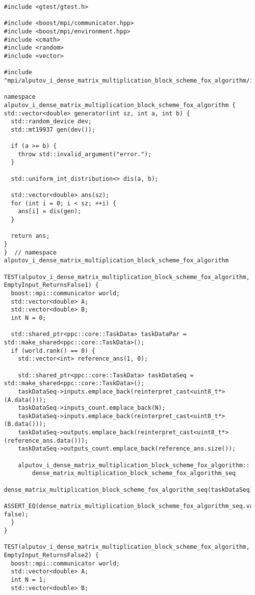 \documentclass{report}
\begin{document}
\begin{lstlisting}[caption={main.cpp(func tests)},label=lst:opsmpi2]
#include <gtest/gtest.h>

#include <boost/mpi/communicator.hpp>
#include <boost/mpi/environment.hpp>
#include <cmath>
#include <random>
#include <vector>

#include "mpi/alputov_i_dense_matrix_multiplication_block_scheme_fox_algorithm/include/ops_mpi.hpp"

namespace alputov_i_dense_matrix_multiplication_block_scheme_fox_algorithm {
std::vector<double> generator(int sz, int a, int b) {
  std::random_device dev;
  std::mt19937 gen(dev());

  if (a >= b) {
    throw std::invalid_argument("error.");
  }

  std::uniform_int_distribution<> dis(a, b);

  std::vector<double> ans(sz);
  for (int i = 0; i < sz; ++i) {
    ans[i] = dis(gen);
  }

  return ans;
}
}  // namespace alputov_i_dense_matrix_multiplication_block_scheme_fox_algorithm

TEST(alputov_i_dense_matrix_multiplication_block_scheme_fox_algorithm, EmptyInput_ReturnsFalse1) {
  boost::mpi::communicator world;
  std::vector<double> A;
  std::vector<double> B;
  int N = 0;

  std::shared_ptr<ppc::core::TaskData> taskDataPar = std::make_shared<ppc::core::TaskData>();
  if (world.rank() == 0) {
    std::vector<int> reference_ans(1, 0);

    std::shared_ptr<ppc::core::TaskData> taskDataSeq = std::make_shared<ppc::core::TaskData>();
    taskDataSeq->inputs.emplace_back(reinterpret_cast<uint8_t*>(A.data()));
    taskDataSeq->inputs_count.emplace_back(N);
    taskDataSeq->inputs.emplace_back(reinterpret_cast<uint8_t*>(B.data()));
    taskDataSeq->outputs.emplace_back(reinterpret_cast<uint8_t*>(reference_ans.data()));
    taskDataSeq->outputs_count.emplace_back(reference_ans.size());

    alputov_i_dense_matrix_multiplication_block_scheme_fox_algorithm::
        dense_matrix_multiplication_block_scheme_fox_algorithm_seq
            dense_matrix_multiplication_block_scheme_fox_algorithm_seq(taskDataSeq);
    ASSERT_EQ(dense_matrix_multiplication_block_scheme_fox_algorithm_seq.validation(), false);
  }
}

TEST(alputov_i_dense_matrix_multiplication_block_scheme_fox_algorithm, EmptyInput_ReturnsFalse2) {
  boost::mpi::communicator world;
  std::vector<double> A;
  int N = 1;
  std::vector<double> B;


\end{lstlisting}
\end{document}
